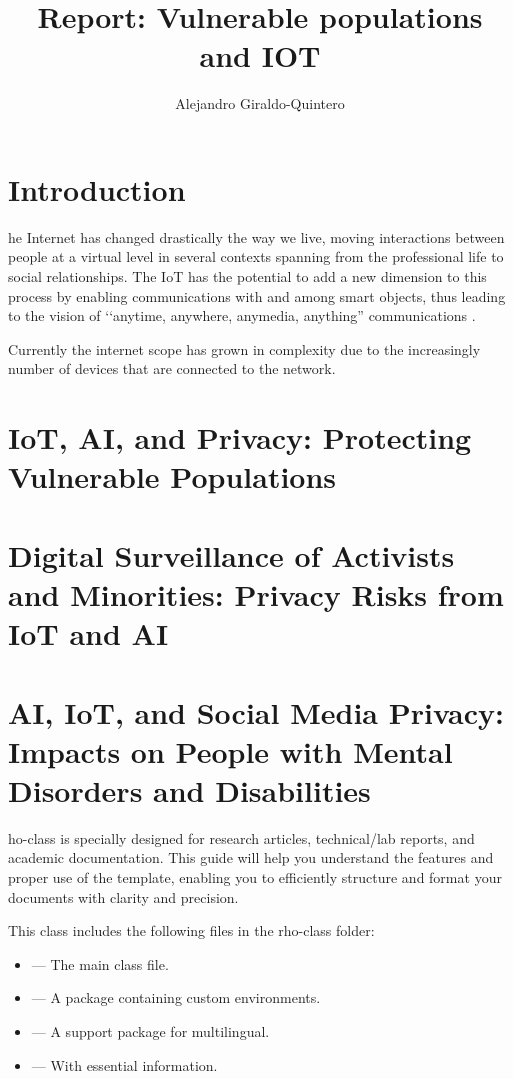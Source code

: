 \documentclass[9pt,a4paper,twocolumn,twoside]{rho-class/rho}
\title{Report: Vulnerable populations and IOT}
\author[{\textasteriskcentered},a,1]{Alejandro Giraldo-Quintero}
\affil[a]{University of Louisville}
\begin{document}
    \maketitle
    \thispagestyle{firststyle}


\section{Introduction}


he Internet has changed drastically the way we live, moving interactions between people at a virtual level in several contexts spanning from the professional life to social relationships. The IoT has the potential to add a new dimension to this process by enabling communications with and among smart objects, thus leading to the vision of ‘‘anytime, anywhere, anymedia, anything” communications \cite{atzori_internet_2010}.

Currently the internet scope has grown in complexity due to the increasingly number of devices that are connected to the network. 


\section{IoT, AI, and Privacy: Protecting Vulnerable Populations}

\section{Digital Surveillance of Activists and Minorities: Privacy Risks from IoT and AI}

\section{AI, IoT, and Social Media Privacy: Impacts on People with Mental Disorders and Disabilities}


    ho-class is specially designed for research articles, technical/lab reports, and academic documentation. This guide will help you understand the features and proper use of the template, enabling you to efficiently structure and format your documents with clarity and precision.

    This class includes the following files in the rho-class folder:
	
	\begin{itemize}
		\item {} — The main class file.
		\item {} — A package containing custom environments.
		\item {} — A support package for multilingual.
		\item {} — With essential information.
	\end{itemize}
\end{document}
